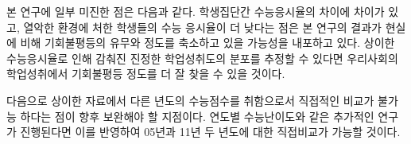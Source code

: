 본 연구에 일부 미진한 점은 다음과 같다.
 학생집단간 수능응시율의 차이에 차이가 있고, 열악한 환경에 처한 학생들의 수능 응시율이 더 낮다는 점은 본 연구의 결과가 현실에 비해 기회불평등의 유무와 정도를 축소하고 있을 가능성을 내포하고 있다.
 상이한 수능응시율로 인해 감춰진 진정한 학업성취도의 분포를 추정할 수 있다면 우리사회의 학업성취에서 기회불평등 정도를 더 잘 찾을 수 있을 것이다.

다음으로 상이한 자료에서 다른 년도의 수능점수를 취함으로서 직접적인 비교가 불가능 하다는 점이 향후 보완해야 할 지점이다.
 연도별 수능난이도와 같은 추가적인 연구가 진행된다면 이를 반영하여 05년과 11년 두 년도에 대한 직접비교가 가능할 것이다.